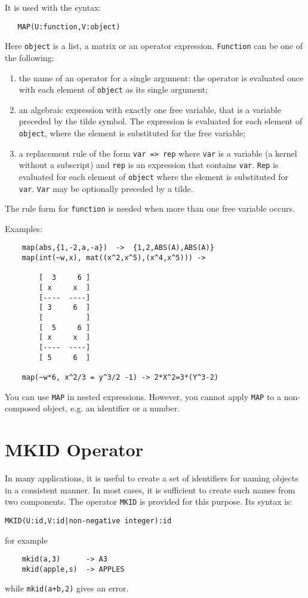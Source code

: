 It is used with the syntax:
\begin{verbatim}
   MAP(U:function,V:object)
\end{verbatim}
Here {\tt object} is a list, a matrix or an operator expression.
{\tt Function} can be one of the following:
\begin{enumerate}
\item the name of an operator for a single argument: the operator
is evaluated once with each element of {\tt object} as its single argument;
\item an algebraic expression with exactly one free variable, that is
a variable preceded by the tilde symbol. The expression
is evaluated for each element of {\tt object}, where the element is
substituted for the free variable;
\item a replacement rule of the form {\tt var => rep}
where {\tt var} is a variable (a kernel without a subscript)
and {\tt rep} is an expression that contains {\tt var}.
{\tt Rep} is evaluated for each element of {\tt object} where
the element is substituted for  {\tt var}. {\tt Var} may be
optionally preceded by a tilde.
\end{enumerate}
The rule form  for {\tt function} is needed when more than
one free variable occurs.

Examples:
\begin{verbatim}
	map(abs,{1,-2,a,-a})  ->  {1,2,ABS(A),ABS(A)}
	map(int(~w,x), mat((x^2,x^5),(x^4,x^5))) ->

		[  3     6 ]
		[ x     x  ]
		[----  ----]
		[ 3     6  ]
		[          ]
		[  5     6 ]
		[ x     x  ]
		[----  ----]
		[ 5     6  ]

	map(~w*6, x^2/3 = y^3/2 -1) -> 2*X^2=3*(Y^3-2)
\end{verbatim}

You can use {\tt MAP} in nested expressions. However, you cannot
apply {\tt MAP} to a non-composed object, e.g. an identifier or a number.


\section{MKID Operator}
In many applications, it is useful to create a set of identifiers for
naming objects in a consistent manner. In most cases, it is sufficient to
create such names from two components. The operator {\tt MKID} is provided
for this purpose. Its syntax is:
\begin{verbatim}
MKID(U:id,V:id|non-negative integer):id
\end{verbatim}
for example
\begin{verbatim}
	mkid(a,3)      -> A3
	mkid(apple,s)  -> APPLES
\end{verbatim}
while {\tt mkid(a+b,2)} gives an error.

